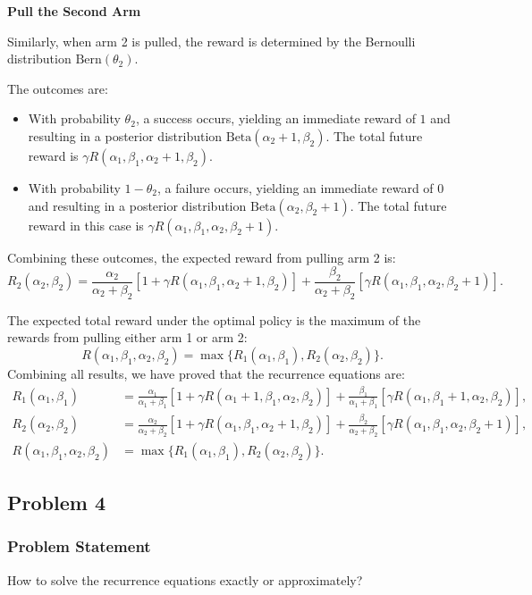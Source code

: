 \documentclass[11pt]{article}
\begin{document}
\noindent\textbf{Pull the Second Arm}

Similarly, when arm 2 is pulled, the reward is determined by the Bernoulli distribution \( \text{Bern}(\theta_2) \). 

The outcomes are:
\begin{itemize}
    \item With probability \(\theta_2\), a success occurs, yielding an immediate reward of \( 1 \) and resulting in a posterior distribution \( \text{Beta}(\alpha_2 + 1, \beta_2) \). The total future reward is \(\gamma R(\alpha_1, \beta_1, \alpha_2 + 1, \beta_2)\).
    \item With probability \(1 - \theta_2\), a failure occurs, yielding an immediate reward of \( 0 \) and resulting in a posterior distribution \( \text{Beta}(\alpha_2, \beta_2 + 1) \). The total future reward in this case is \(\gamma R(\alpha_1, \beta_1, \alpha_2, \beta_2 + 1)\).
\end{itemize}
Combining these outcomes, the expected reward from pulling arm 2 is:
\[
R_2(\alpha_2, \beta_2) = \frac{\alpha_2}{\alpha_2 + \beta_2} [1 + \gamma R(\alpha_1, \beta_1, \alpha_2 + 1, \beta_2)] + \frac{\beta_2}{\alpha_2 + \beta_2} [\gamma R(\alpha_1, \beta_1, \alpha_2, \beta_2 + 1)].
\]

The expected total reward under the optimal policy is the maximum of the rewards from pulling either arm 1 or arm 2:
\[
R(\alpha_1, \beta_1, \alpha_2, \beta_2) = \max\{R_1(\alpha_1, \beta_1), R_2(\alpha_2, \beta_2)\}.
\]
Combining all results, we have proved that the recurrence equations are:
\begin{align*}
R_1(\alpha_1, \beta_1) &= \frac{\alpha_1}{\alpha_1 + \beta_1}[1 + \gamma R(\alpha_1 + 1, \beta_1, \alpha_2, \beta_2)] + \frac{\beta_1}{\alpha_1 + \beta_1}[\gamma R(\alpha_1, \beta_1 + 1, \alpha_2, \beta_2)], \\
R_2(\alpha_2, \beta_2) &= \frac{\alpha_2}{\alpha_2 + \beta_2}[1 + \gamma R(\alpha_1, \beta_1, \alpha_2 + 1, \beta_2)] + \frac{\beta_2}{\alpha_2 + \beta_2}[\gamma R(\alpha_1, \beta_1, \alpha_2, \beta_2 + 1)], \\
R(\alpha_1, \beta_1, \alpha_2, \beta_2) &= \max\{R_1(\alpha_1, \beta_1), R_2(\alpha_2, \beta_2)\}.
\end{align*}


\newpage
\subsection{Problem 4}
\subsubsection*{Problem Statement}
How to solve the recurrence equations exactly or approximately?
\end{document}
